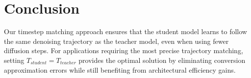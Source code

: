 \documentclass{article}
\begin{document}
\section{Conclusion}

Our timestep matching approach ensures that the student model learns to follow the same denoising trajectory as the teacher model, even when using fewer diffusion steps. For applications requiring the most precise trajectory matching, setting $T_{student} = T_{teacher}$ provides the optimal solution by eliminating conversion approximation errors while still benefiting from architectural efficiency gains.
\end{document}
